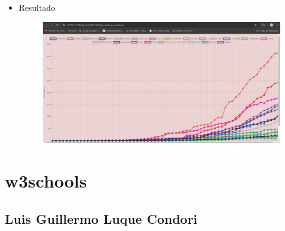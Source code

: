 \documentclass{article}
\begin{document}
\begin{itemize}
\begin{figure}[H]
		\end{figure}
		\item Resultado
		\begin{figure}[H]
			\centering
			\includegraphics[width=1.0\textwidth,keepaspectratio]{img/Ejer8T2Result.jpg}
		\end{figure}
	\end{itemize}

	\section{w3schools}

	\subsection{Luis Guillermo Luque Condori}
\end{document}
